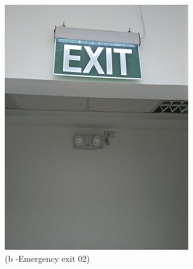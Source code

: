 \begin{figure}
\begin{minipage}[b]{0.22\linewidth}
				\includegraphics[width=\textwidth]{figures/R1P_safety/emergencyexitsignale02.jpg}
		\caption*{(b -Emergency exit 02)}
	\end{minipage}
	\hspace{0.05cm}
	\begin{minipage}[b]{0.22\linewidth}
		\centering

\end{minipage}
\end{figure}
